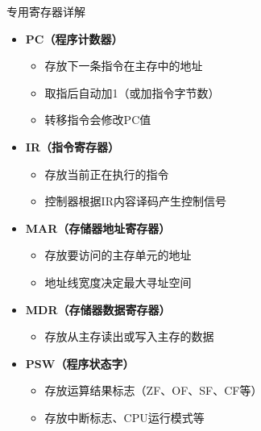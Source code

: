\documentclass[10pt, aspectratio=169]{beamer}
\begin{document}
\begin{frame}{专用寄存器详解}
    \begin{itemize}
        \item \textbf{PC（程序计数器）}
            \begin{itemize}
                \item 存放下一条指令在主存中的地址
                \item 取指后自动加1（或加指令字节数）
                \item 转移指令会修改PC值
            \end{itemize}
        \item \textbf{IR（指令寄存器）}
            \begin{itemize}
                \item 存放当前正在执行的指令
                \item 控制器根据IR内容译码产生控制信号
            \end{itemize}
        \item \textbf{MAR（存储器地址寄存器）}
            \begin{itemize}
                \item 存放要访问的主存单元的地址
                \item 地址线宽度决定最大寻址空间
            \end{itemize}
        \item \textbf{MDR（存储器数据寄存器）}
            \begin{itemize}
                \item 存放从主存读出或写入主存的数据
            \end{itemize}
        \item \textbf{PSW（程序状态字）}
            \begin{itemize}
                \item 存放运算结果标志（ZF、OF、SF、CF等）
                \item 存放中断标志、CPU运行模式等
            \end{itemize}
    \end{itemize}
\end{frame}
\end{document}
